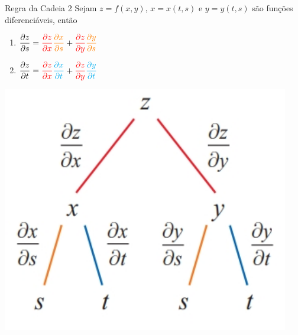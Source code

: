 \begin{frame}[label=der-parciais]
	\frametitle{ }
\begin{minipage}{0.6\textwidth}
\begin{block}{Regra da Cadeia 2}
Sejam $z=f(x,y)$,  $x=x(t,s)$ e $y=y(t,s)$ são funções diferenciáveis, então
\begin{enumerate}[a]
	\item $\displaystyle\frac{\partial z}{\partial s}={\color{red}\frac{\partial z}{\partial x}}{\color{orange}\frac{\partial x}{\partial s}}+{\color{red}\frac{\partial z}{\partial y}}{\color{orange}\frac{\partial y}{\partial s}}$
	\item $\displaystyle\frac{\partial z}{\partial t}={\color{red}\frac{\partial z}{\partial x}}{\color{cyan}\frac{\partial x}{\partial t}}+{\color{red}\frac{\partial z}{\partial y}}{\color{cyan}\frac{\partial y}{\partial t}}$

		\end{enumerate} 
\end{block}
\end{minipage}\qquad
\begin{minipage}{0.3\textwidth}
\includegraphics[scale=.3]{figuras/cadeia2.png}
\end{minipage}
		
\end{frame}




